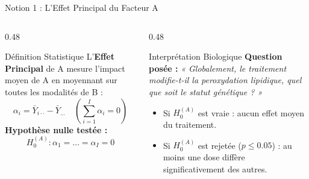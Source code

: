 \documentclass[aspectratio=169,10pt]{beamer}
\begin{document}
\begin{frame}{Notion 1 : L'Effet Principal du Facteur A}
  \begin{columns}[onlytextwidth, T]
    \begin{column}{0.48\linewidth}
      \begin{conceptbox}{Définition Statistique}
        \small
        L'\textbf{Effet Principal} de A mesure l'impact moyen de A en moyennant sur toutes les modalités de B :
        \begin{equation*}
          \alpha_i = \bar{Y}_{i\cdot\cdot} - \bar{Y}_{\dots} \quad \left(\sum_{i=1}^I \alpha_i = 0\right)
        \end{equation*}
        \textbf{Hypothèse nulle testée :}
        \begin{equation*}
          H_0^{(A)} : \alpha_1 = \dots = \alpha_I = 0
        \end{equation*}
      \end{conceptbox}
    \end{column}
    \begin{column}{0.48\linewidth}
      \begin{biobox}{Interprétation Biologique}
        \small
        \textbf{Question posée :} \textit{« Globalement, le traitement modifie-t-il la peroxydation lipidique, quel que soit le statut génétique ? »}
        \begin{itemize}
          \item Si $H_0^{(A)}$ est vraie : aucun effet moyen du traitement.
          \item Si $H_0^{(A)}$ est rejetée ($p \le 0.05$) : au moins une dose diffère significativement des autres.
        \end{itemize}
      \end{biobox}
    \end{column}
  \end{columns}
\end{frame}
\end{document}
